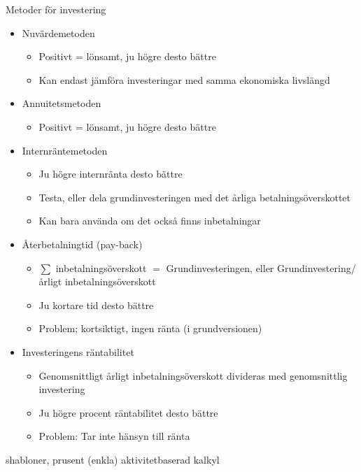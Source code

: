 Metoder för investering 
\begin{itemize}
    \item Nuvärdemetoden
    \begin{itemize}
        \item Positivt = lönsamt, ju högre desto bättre
        \item Kan endast jämföra investeringar med samma ekonomiska livslängd
    \end{itemize}
    \item Annuitetsmetoden
    \begin{itemize}
        \item Positivt = lönsamt, ju högre desto bättre
    \end{itemize}
    \item Internräntemetoden
    \begin{itemize}
        \item Ju högre internränta desto bättre 
        \item Testa, eller dela grundinvesteringen med det årliga betalningsöverskottet
        \item Kan bara använda om det också finns inbetalningar
    \end{itemize}
    \item Återbetalningtid (pay-back)
    \begin{itemize}
        \item $\sum$ inbetalningsöverskott $=$ Grundinvesteringen, eller Grundinvestering/årligt inbetalningsöverskott
        \item Ju kortare tid desto bättre
        \item Problem; kortsiktigt, ingen ränta (i grundversionen)
    \end{itemize}
    \item Investeringens räntabilitet
    \begin{itemize}
        \item Genomsnittligt årligt inbetalningsöverskott divideras med genomsnittlig investering 
        \item Ju högre procent räntabilitet desto bättre 
        \item Problem: Tar inte hänsyn till ränta
    \end{itemize}
\end{itemize}



shabloner, prusent (enkla)
aktivitetbaserad kalkyl 

